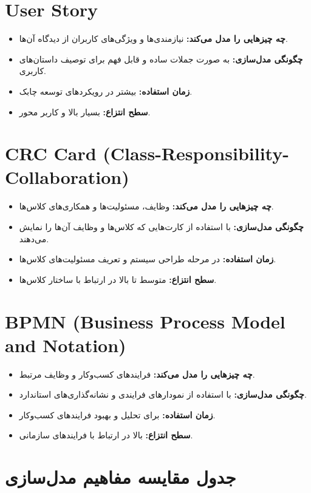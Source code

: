 \section*{User Story}
\begin{itemize}
	\item \textbf{چه چیزهایی را مدل می‌کند:} نیازمندی‌ها و ویژگی‌های کاربران از دیدگاه آن‌ها.
	\item \textbf{چگونگی مدل‌سازی:} به صورت جملات ساده و قابل فهم برای توصیف داستان‌های کاربری.
	\item \textbf{زمان استفاده:} بیشتر در رویکردهای توسعه چابک.
	\item \textbf{سطح انتزاع:} بسیار بالا و کاربر محور.
\end{itemize}

\section*{CRC Card (Class-Responsibility-Collaboration)}
\begin{itemize}
	\item \textbf{چه چیزهایی را مدل می‌کند:} وظایف، مسئولیت‌ها و همکاری‌های کلاس‌ها.
	\item \textbf{چگونگی مدل‌سازی:} با استفاده از کارت‌هایی که کلاس‌ها و وظایف آن‌ها را نمایش می‌دهند.
	\item \textbf{زمان استفاده:} در مرحله طراحی سیستم و تعریف مسئولیت‌های کلاس‌ها.
	\item \textbf{سطح انتزاع:} متوسط تا بالا در ارتباط با ساختار کلاس‌ها.
\end{itemize}

\section*{BPMN (Business Process Model and Notation)}
\begin{itemize}
	\item \textbf{چه چیزهایی را مدل می‌کند:} فرایندهای کسب‌وکار و وظایف مرتبط.
	\item \textbf{چگونگی مدل‌سازی:} با استفاده از نمودارهای فرایندی و نشانه‌گذاری‌های استاندارد.
	\item \textbf{زمان استفاده:} برای تحلیل و بهبود فرایندهای کسب‌وکار.
	\item \textbf{سطح انتزاع:} بالا در ارتباط با فرایندهای سازمانی.
\end{itemize}

\section*{جدول مقایسه مفاهیم مدل‌سازی}

